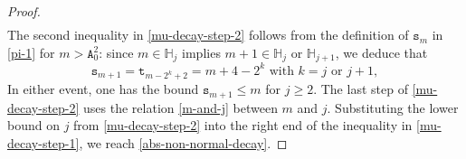 \documentclass[12pt, twoside]{article}
\theoremstyle{definition}
\numberwithin{equation}{section}
\begin{document}
\begin{proof}
\begin{align}
\end{align}
The second inequality in \eqref{mu-decay-step-2} follows from the definition of $\mathtt s_m$ in \eqref{pi-1} for $m > \mathtt A_0^2$: since $m \in \mathbb H_j$ implies $m+1 \in \mathbb H_j$ or $\mathbb H_{j+1}$, we deduce that 
\[ \mathtt s_{m+1} = \mathtt t_{m - 2^k + 2} = m+4 - 2^k \text{ with  $k = j$ or $j+1$}, \] 
In either event, one has the bound $\mathtt s_{m+1} \leq m$ for $j \geq 2$. The last step of \eqref{mu-decay-step-2} uses the relation \eqref{m-and-j} between $m$ and $j$. Substituting the lower bound on $j$ from \eqref{mu-decay-step-2} into the right end of the inequality in \eqref{mu-decay-step-1}, we reach \eqref{abs-non-normal-decay}. 
\vskip0.1in 
\noindent 
\end{proof}   
\end{document}
